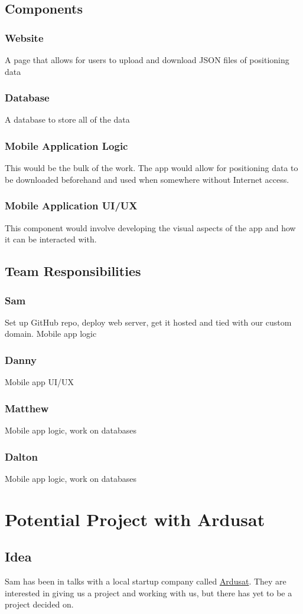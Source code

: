 \documentclass[pdftex,11pt,a4paper]{article}
\begin{document}
\subsection{Components}
\subsubsection{Website}
A page that allows for users to upload and download JSON files of positioning data

\subsubsection{Database}
A database to store all of the data

\subsubsection{Mobile Application Logic}
This would be the bulk of the work. The app would allow for positioning data to be downloaded beforehand and used when somewhere without Internet access.

\subsubsection{Mobile Application UI/UX}
This component would involve developing the visual aspects of the app and how it can be interacted with.

\subsection{Team Responsibilities}
\subsubsection{Sam}
Set up GitHub repo, deploy web server, get it hosted and tied with our custom domain. Mobile app logic

\subsubsection{Danny}
Mobile app UI/UX

\subsubsection{Matthew}
Mobile app logic, work on databases

\subsubsection{Dalton}
Mobile app logic, work on databases
\clearpage
\section{Potential Project with Ardusat}
\subsection{Idea}
Sam has been in talks with a local startup company called \href{http://www.ardusat.com}{Ardusat}. They are interested in giving us a project and working with us, but there has yet to be a project decided on.
\end{document}
